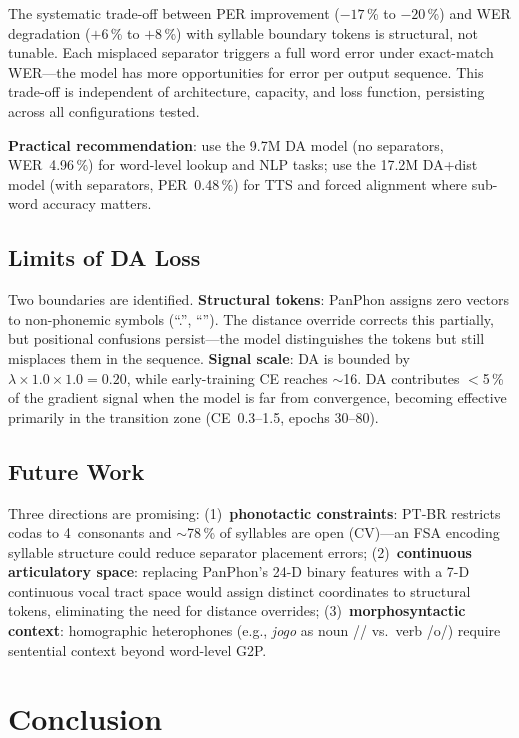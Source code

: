 \documentclass[conference]{IEEEtran}
\newcommand{\lam}{\lambda}                %
\begin{document}
The systematic trade-off between PER improvement ($-17$\,\% to
$-20$\,\%) and WER degradation ($+6$\,\% to $+8$\,\%) with
syllable boundary tokens is structural, not tunable.
Each misplaced separator triggers a full word error under
exact-match WER---the model has more opportunities for error per
output sequence.
This trade-off is independent of architecture, capacity, and loss
function, persisting across all configurations tested.

\textbf{Practical recommendation}: use the 9.7M DA model (no
separators, WER~4.96\,\%) for word-level lookup and NLP tasks;
use the 17.2M DA+dist model (with separators, PER~0.48\,\%) for
TTS and forced alignment where sub-word accuracy matters.

\subsection{Limits of DA Loss}

Two boundaries are identified.
\textbf{Structural tokens}: PanPhon assigns zero vectors to
non-phonemic symbols (``.'', ``''). The distance
override corrects this partially, but positional confusions
persist---the model distinguishes the tokens but still misplaces
them in the sequence.
\textbf{Signal scale}: DA is bounded by
$\lam\!\times\!1.0\!\times\!1.0 = 0.20$, while early-training
CE reaches $\sim$16.
DA contributes $<$5\,\% of the gradient signal when the model is
far from convergence, becoming effective primarily in the
transition zone (CE~0.3--1.5, epochs 30--80).

\subsection{Future Work}

Three directions are promising:
(1)~\textbf{phonotactic constraints}: PT-BR restricts codas to
4~consonants and $\sim$78\,\% of syllables are open (CV)---an FSA
encoding syllable structure could reduce separator placement errors;
(2)~\textbf{continuous articulatory space}: replacing PanPhon's
24-D binary features with a 7-D continuous vocal tract space would
assign distinct coordinates to structural tokens, eliminating the
need for distance overrides;
(3)~\textbf{morphosyntactic context}: homographic heterophones
(e.g., \textit{jogo} as noun // vs.\ verb /o/) require
sentential context beyond word-level G2P.

\section{Conclusion}
\end{document}
